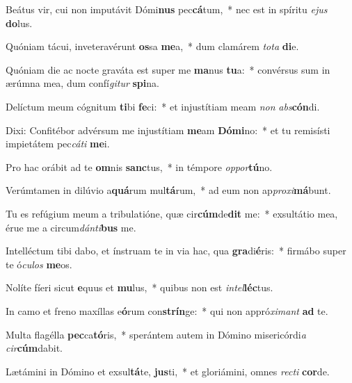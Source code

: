 \item Beátus vir, cui non imputávit Dómi\textbf{nus} pec\textbf{cá}tum,~* nec est in spíritu \textit{e}\textit{jus} \textbf{do}lus.
\item Quóniam tácui, inveteravérunt \textbf{os}sa \textbf{me}a,~* dum clamárem \textit{to}\textit{ta} \textbf{di}e.
\item Quóniam die ac nocte graváta est super me \textbf{ma}nus \textbf{tu}a:~* convérsus sum in ærúmna mea, dum confí\textit{gi}\textit{tur} \textbf{spi}na.
\item Delíctum meum cógnitum \textbf{ti}bi \textbf{fe}ci:~* et injustítiam meam \textit{non} \textit{abs}\textbf{cón}di.
\item Dixi: Confitébor advérsum me injustítiam \textbf{me}am \textbf{Dó}\textbf{mi}no:~* et tu remisísti impietátem pec\textit{cá}\textit{ti} \textbf{me}i.
\item Pro hac orábit ad te \textbf{om}nis \textbf{sanc}tus,~* in témpore \textit{op}\textit{por}\textbf{tú}no.
\item Verúmtamen in dilúvio a\textbf{quá}rum mul\textbf{tá}rum,~* ad eum non ap\textit{pro}\textit{xi}\textbf{má}bunt.
\item Tu es refúgium meum a tribulatióne, quæ cir\textbf{cúm}de\textbf{dit} me:~* exsultátio mea, érue me a circum\textit{dán}\textit{ti}\textbf{bus} me.
\item Intelléctum tibi dabo, et ínstruam te in via hac, qua \textbf{gra}di\textbf{é}ris:~* firmábo super te ó\textit{cu}\textit{los} \textbf{me}os.
\item Nolíte fíeri sicut \textbf{e}quus et \textbf{mu}lus,~* quibus non est \textit{in}\textit{tel}\textbf{léc}tus.
\item In camo et freno maxíllas e\textbf{ó}rum con\textbf{strín}ge:~* qui non appró\textit{xi}\textit{mant} \textbf{ad} te.
\item Multa flagélla \textbf{pec}ca\textbf{tó}ris,~* sperántem autem in Dómino misericórdi\textit{a} \textit{cir}\textbf{cúm}dabit.
\item Lætámini in Dómino et exsul\textbf{tá}te, \textbf{jus}ti,~* et gloriámini, omnes \textit{rec}\textit{ti} \textbf{cor}de.
